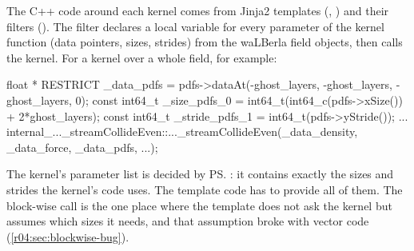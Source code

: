 The C++ code around each kernel comes from Jinja2 templates
(, )
and their filters (). The filter
 declares a local variable for every parameter of the kernel
function (data pointers, sizes, strides) from the waLBerla field objects, then calls
the kernel. For a kernel over a whole field, for example:
\begin{ccode}
float * RESTRICT  _data_pdfs = pdfs->dataAt(-ghost_layers, -ghost_layers, -ghost_layers, 0);
const int64_t _size_pdfs_0   = int64_t(int64_c(pdfs->xSize()) + 2*ghost_layers);
const int64_t _stride_pdfs_1 = int64_t(pdfs->yStride());
...
internal_..._streamCollideEven::..._streamCollideEven(_data_density, _data_force, _data_pdfs, ...);
\end{ccode}
The kernel's parameter list is decided by \ps{}: it contains exactly the sizes and
strides the kernel's code uses. The template code has to provide all of them. The
block-wise call is the one place where the template does not ask the kernel but
assumes which sizes it needs, and that assumption broke with vector code
(\cref{r04:sec:blockwise-bug}).
